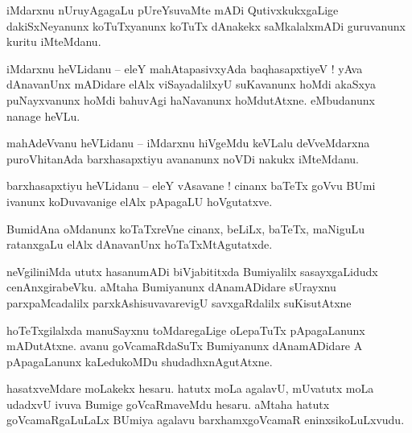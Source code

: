 \documentclass{article}
\begin{document}

\begin{mn}%
iMdarxnu nUruyAgagaLu pUreYsuvaMte mADi QutivxkukxgaLige dakiSxNeyanunx koTuTxyanunx koTuTx 
dAnakekx saMkalalxmADi guruvanunx kuritu iMteMdanu.
\end{mn}

\begin{mn}%
iMdarxnu heVLidanu -- eleY mahAtapasivxyAda baqhasapxtiyeV ! yAva dAnavanUnx mADidare elAlx 
viSayadalilxyU suKavanunx hoMdi akaSxya puNayxvanunx hoMdi bahuvAgi haNavanunx hoMdutAtxne. 
eMbudanunx nanage heVLu.
\end{mn}

\begin{mn}%
mahAdeVvanu heVLidanu -- iMdarxnu hiVgeMdu keVLalu deVveMdarxna puroVhitanAda barxhasapxtiyu 
avananunx noVDi nakukx iMteMdanu.
\end{mn}

\begin{mn}%
barxhasapxtiyu heVLidanu -- eleY vAsavane ! cinanx baTeTx goVvu BUmi ivanunx koDuvavanige elAlx 
pApagaLU hoVgutatxve.
\end{mn}

\begin{mn}%
BumidAna oMdanunx koTaTxreVne cinanx, beLiLx, baTeTx, maNiguLu ratanxgaLu elAlx dAnavanUnx 
hoTaTxMtAgutatxde.
\end{mn}

\begin{mn}%
neVgiliniMda ututx hasanumADi biVjabititxda Bumiyalilx sasayxgaLidudx cenAnxgirabeVku. aMtaha 
Bumiyanunx dAnamADidare sUrayxnu parxpaMcadalilx parxkAshisuvavarevigU savxgaRdalilx suKisutAtxne
\end{mn}

\begin{mn}%
hoTeTxgilalxda manuSayxnu toMdaregaLige oLepaTuTx pApagaLanunx mADutAtxne. avanu goVcamaRdaSuTx 
Bumiyanunx dAnamADidare A pApagaLanunx kaLedukoMDu shudadhxnAgutAtxne.
\end{mn}

\begin{mn}%
hasatxveMdare moLakekx hesaru. hatutx moLa agalavU, mUvatutx moLa udadxvU ivuva Bumige 
goVcaRmaveMdu hesaru. aMtaha hatutx goVcamaRgaLuLaLx BUmiya agalavu barxhamxgoVcamaR 
eninxsikoLuLxvudu.
\end{mn}
\end{document}
